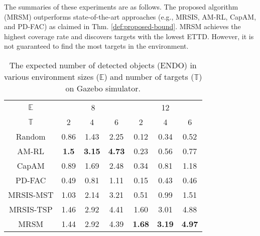 The summaries of these experiments are as follows.
The proposed algorithm (MRSM) outperforms state-of-the-art approaches (e.g., MRSIS\cite{li2024mrsis}, AM-RL\cite{kool2018attention}, CapAM\cite{paull2022learning}, and PD-FAC\cite{sheng2022pd}) as claimed in Thm. \ref{def:proposed-bound}.
MRSM achieves the highest coverage rate and discovers targets with the lowest ETTD.
However, it is not guaranteed to find the most targets in the environment.


\begin{table}[h]
  \centering
  \caption{The expected number of detected objects (ENDO) in various environment sizes ($\mathit{\mathbb{E}}$) and number of targets ($\mathit{\mathbb{T}}$) on Gazebo simulator.}
  \label{tab:ANDO}
  \begin{tabular}{ccccccc}
  \toprule
   $\mathit{\mathbb{E}}$ & \multicolumn{3}{c}{8} & \multicolumn{3}{c}{12} \\
  \cmidrule(lr){2-4} \cmidrule(lr){5-7}
   $\mathit{\mathbb{T}}$ & 2 & 4 & 6 & 2 & 4 & 6 \\
  \midrule
  Random & 0.86 & 1.43 & 2.25 & 0.12 & 0.34 & 0.52 \\
  AM-RL & \textbf{1.5} & \textbf{3.15} & \textbf{4.73} & 0.23 & 0.56 & 0.77 \\
  CapAM & 0.89 & 1.69 & 2.48 & 0.34 & 0.81 & 1.18 \\
  PD-FAC & 0.49 & 0.81 & 1.11 & 0.15 & 0.43 & 0.46 \\
  MRSIS-MST & 1.03 & 2.14 & 3.21 & 0.51 & 0.99 & 1.51 \\
  MRSIS-TSP & 1.46 & 2.92 & 4.41 & 1.60 & 3.01 & 4.88 \\
  MRSM & 1.44 & 2.92 & 4.39 & \textbf{1.68} & \textbf{3.19} & \textbf{4.97} \\
  \bottomrule
  \end{tabular}
  \end{table}

